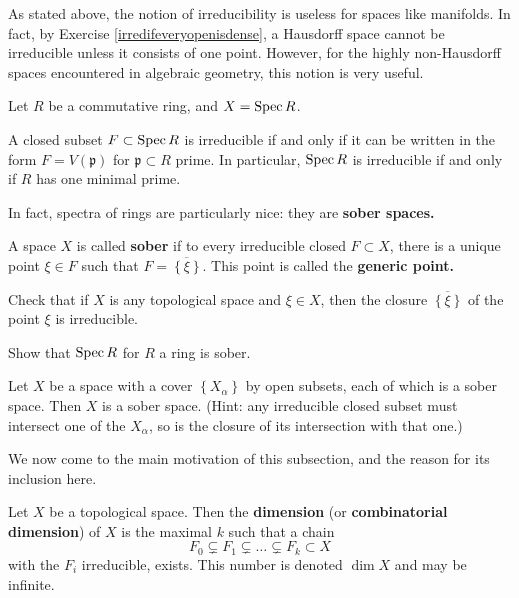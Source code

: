 As stated above, the  notion of irreducibility is useless for spaces
like manifolds. In fact, by Exercise \ref{irredifeveryopenisdense}, a
Hausdorff space cannot be irreducible unless it consists of one point.
However, for the highly non-Hausdorff spaces encountered in algebraic geometry, this notion is very
useful.

Let $R$ be a commutative ring, and $X = \operatorname{Spec} R$.

\begin{exercise} 
A closed subset $F \subset \operatorname{Spec} R$ is irreducible if and only if it can be
written in the form $F = V(\mathfrak{p})$ for $\mathfrak{p} \subset R$ prime.
In particular, $\operatorname{Spec} R$ is irreducible if and only if $R$ has one minimal
prime. 
\end{exercise} 

In fact, spectra of rings are particularly nice: they are \textbf{sober
spaces.}
\begin{definition} 
A space $X$ is called \textbf{sober} if to every irreducible closed $F \subset
X$, there is a unique point $\xi \in F$ such that $F = \overline{ \left\{\xi\right\}}$. 
This point is called the \textbf{generic point.}
\end{definition} 

\begin{exercise} 
Check that if $X$ is any topological space and $\xi  \in X$, then the closure
$\overline{\left\{\xi\right\}}$ of the point $\xi$ is irreducible.
\end{exercise} 

\begin{exercise} 
Show that $\operatorname{Spec} R$ for $R$ a ring is sober.
\end{exercise} 

\begin{exercise} 
Let $X$ be a space with a cover $\left\{X_\alpha\right\}$ by open subsets,
each of which is a sober space. Then $X$ is a sober space. (Hint: any
irreducible closed subset must intersect one of the $X_\alpha$, so is the
closure of its intersection with that one.)
\end{exercise} 

We now come to the main motivation of this subsection, and the reason for its
inclusion here.

\begin{definition} 
Let $X$ be a topological space. Then the \textbf{dimension} (or
\textbf{combinatorial dimension}) of $X$ is the maximal $k$ such that a chain
\[ F_0 \subsetneq F_1 \subsetneq \dots \subsetneq F_k \subset X  \]
with the $F_i$ irreducible, exists. This number is denoted $\dim X$ and may be
infinite.
\end{definition} 

